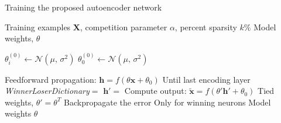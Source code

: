 %
%
%
%
%

\begin{algorithm}
\caption{Training the proposed autoencoder network}
\label{algo:training}
\begin{algorithmic}[1]

\INPUT Training examples $\mathbf{X}$, competition parameter $\alpha$, percent sparsity $k\%$
\OUTPUT Model weights, $\theta$

\item[]
    \State $\theta_{i}^{(0)} \gets \mathcal{N}(\mu,\,\sigma^{2})$
    \State $\theta_{0}^{(0)} \gets \mathcal{N}(\mu,\,\sigma^{2})$
\EndProcedure

\item[]
        \State Feedforward propagation: $\mathbf{h} = f(\theta \mathbf{x} + \theta_{0})$
        \Comment Until last encoding layer
        \State \textit{WinnerLoserDictionary}$=$
        \State $\mathbf{h'}=$
        \State Compute output: $\mathbf{\widetilde{x}} = f(\theta' \mathbf{h'} + \theta_{0})$
        \Comment Tied weights, $\theta'=\theta^{T}$
        \State Backpropagate the error
        \Comment Only for winning neurons
    \EndFor
    \State \Return Model weights $\theta$ 
\EndProcedure

\end{algorithmic}
\end{algorithm}
